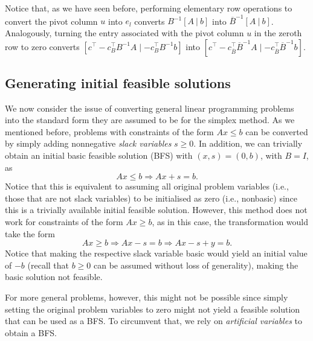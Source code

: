Notice that, as we have seen before, performing elementary row operations to convert the pivot column $u$ into $e_l$ converts $B^{-1}[A ~|~ b]$ into $\overline{B}^{-1}[A ~|~ b]$. Analogously, turning the entry associated with the pivot column $u$ in the zeroth row to zero converts $[c^\top - c_B^\top B^{-1}A \mid -c_B^\top B^{-1}b]$ into $[c^\top - c_{\overline{B}}^\top \overline{B}^{-1}A \mid -c_{\overline{B}}^\top \overline{B}^{-1}b]$.



\subsection{Generating initial feasible solutions} 

We now consider the issue of converting general linear programming problems into the standard form they are assumed to be for the simplex method. As we mentioned before, problems with constraints of the form $Ax \le b$ can be converted by simply adding nonnegative \emph{slack variables} $s \geq 0$. In addition, we can trivially obtain an initial basic feasible solution (BFS) with $(x,s) = (0,b)$, with $B = I$, as
%
\begin{equation*}
		Ax \leq b \Rightarrow Ax + s = b.
\end{equation*}
%
Notice that this is equivalent to assuming all original problem variables (i.e., those that are not slack variables) to be initialised as zero (i.e., nonbasic) since this is a trivially available initial feasible solution. However, this method does not work for constraints of the form $Ax \ge b$, as in this case, the transformation would take the form 
%
\begin{equation*}
	Ax \geq b \Rightarrow Ax - s = b \Rightarrow Ax - s + y = b.	
\end{equation*}
%
Notice that making the respective slack variable basic would yield an initial value of $-b$ (recall that $b \ge 0$ can be assumed without loss of generality), making the basic solution not feasible.

For more general problems, however, this might not be possible since simply setting the original problem variables to zero might not yield a feasible solution that can be used as a BFS. To circumvent that, we rely on \emph{artificial variables} to obtain a BFS.

